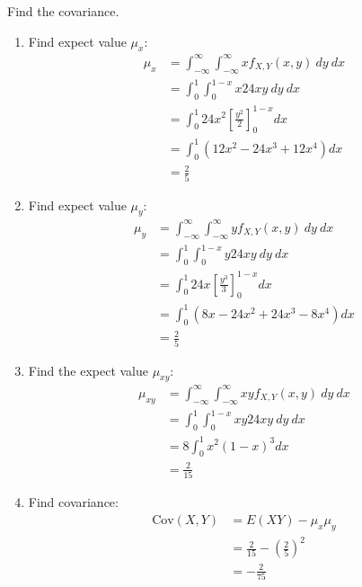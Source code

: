 \documentclass[10pt,a4paper]{article}
\begin{document}
Find the covariance.
\begin{enumerate}
    \item Find expect value $\mu_x$:
    \begin{align*}
        \mu_x &= \int_{-\infty}^{\infty} \int_{-\infty}^{\infty} x f_{X,Y}(x,y) \: dy \: dx \\
        &= \int_0^1 \int_0^{1-x} x 24xy \: dy\: dx \\
        &= \int_0^1 24x^2 \left[\frac{y^2}{2}\right]_0^{1-x} dx \\
        &= \int_0^1 (12x^2 - 24x^3 + 12x^4)dx \\
        &= \frac{2}{5}
    \end{align*}
    \item Find expect value $\mu_y$:
    \begin{align*}
        \mu_y &= \int_{-\infty}^{\infty} \int_{-\infty}^{\infty} y f_{X,Y}(x,y) \: dy \: dx \\
        &= \int_0^1 \int_0^{1-x} y 24xy \: dy\: dx \\
        &= \int_0^1 24x \left[\frac{y^3}{3}\right]_0^{1-x} dx \\
        &= \int_0^1 (8x - 24x^2 + 24x^3 - 8x^4)dx \\
        &= \frac{2}{5}
    \end{align*}
    \item Find the expect value $\mu_{xy}$:
    \begin{align*}
        \mu_{xy} &= \int_{-\infty}^{\infty} \int_{-\infty}^{\infty} xy f_{X,Y}(x,y)\: dy\:dx \\
        &= \int_0^1 \int_0^{1-x} xy 24 xy \: dy\:dx \\
        &= 8 \int_0^1 x^2 (1-x)^3 dx \\
        &= \frac{2}{15}
    \end{align*}
    \item Find covariance:
    \begin{align*}
        \text{Cov}(X,Y) &= E(XY) - \mu_x \mu_y \\
        &= \frac{2}{15} - \left(\frac{2}{5}\right)^2 \\
        &= - \frac{2}{75}
    \end{align*}
\end{enumerate}
\end{document}
